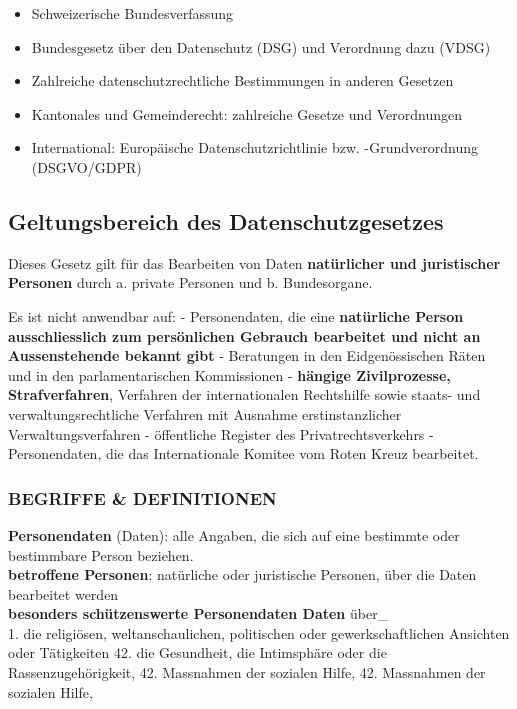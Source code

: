 \begin{itemize}
\tightlist
\item
  Schweizerische Bundesverfassung
\item
  Bundesgesetz über den Datenschutz (DSG) und Verordnung dazu (VDSG)
\item
  Zahlreiche datenschutzrechtliche Bestimmungen in anderen Gesetzen
\item
  Kantonales und Gemeinderecht: zahlreiche Gesetze und Verordnungen
\item
  International: Europäische Datenschutzrichtlinie bzw. -Grundverordnung
  (DSGVO/GDPR)
\end{itemize}

\hypertarget{geltungsbereich-des-datenschutzgesetzes}{%
\subsection{Geltungsbereich des
Datenschutzgesetzes}\label{geltungsbereich-des-datenschutzgesetzes}}

Dieses Gesetz gilt für das Bearbeiten von Daten \textbf{natürlicher und
juristischer Personen} durch a. private Personen und b. Bundesorgane.

Es ist nicht anwendbar auf: - Personendaten, die eine \textbf{natürliche
Person ausschliesslich zum persönlichen Gebrauch bearbeitet und nicht an
Aussenstehende bekannt gibt} - Beratungen in den Eidgenössischen Räten
und in den parlamentarischen Kommissionen - \textbf{hängige
Zivilprozesse, Strafverfahren}, Verfahren der internationalen
Rechtshilfe sowie staats- und verwaltungsrechtliche Verfahren mit
Ausnahme erstinstanzlicher Verwaltungsverfahren - öffentliche Register
des Privatrechtsverkehrs - Personendaten, die das Internationale Komitee
vom Roten Kreuz bearbeitet.

\hypertarget{begriffe-definitionen}{%
\subsubsection{BEGRIFFE \& DEFINITIONEN}\label{begriffe-definitionen}}

\textbf{Personendaten} (Daten): alle Angaben, die sich auf eine
bestimmte oder bestimmbare Person beziehen.\\
\textbf{betroffene Personen}: natürliche oder juristische Personen, über
die Daten bearbeitet werden\\
\textbf{besonders schützenswerte Personendaten Daten} über\_\\
1. die religiösen, weltanschaulichen, politischen oder
gewerkschaftlichen Ansichten oder Tätigkeiten 42. die Gesundheit, die
Intimsphäre oder die Rassenzugehörigkeit, 42. Massnahmen der sozialen
Hilfe, 42. Massnahmen der sozialen Hilfe,

